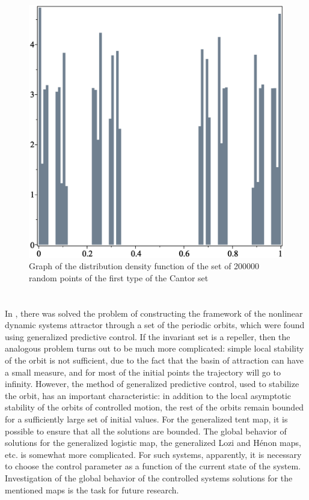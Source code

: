 \documentclass[12pt,a4paper]{amsart}
\begin{document}
\begin{figure}[h!]
\centering
\includegraphics[scale=0.28]{Fig16}
\caption{Graph of the distribution density function of the set of 200000 random points of the first type of the Cantor set} \label{f16}
\end{figure}

\section{}

In \cite{DSI}, there was solved the problem of constructing the framework of the nonlinear dynamic systems attractor through a set of the periodic orbits, which were 
found using generalized predictive control. If the invariant set is a repeller, then the analogous problem turns out to be much more complicated: simple local stability 
of the orbit is not sufficient, due to the fact that the basin of attraction can have a small measure, and for most of the initial points the trajectory will go to infinity. 
However, the method of generalized predictive control, used to stabilize the orbit, has an important characteristic: in addition to the local asymptotic stability 
of the orbits of controlled motion, the rest of the orbits remain bounded for a sufficiently large set of initial values. For the generalized tent map, it is possible to ensure 
that all the solutions are bounded. The global behavior of solutions for the generalized logistic map, the generalized Lozi and Hénon maps, etc. is somewhat more complicated. 
For such systems, apparently, it is necessary to choose the control parameter as a function of the current state of the system. Investigation of the global behavior of 
the controlled systems solutions for the mentioned maps is the task for future research.




\end{document}

